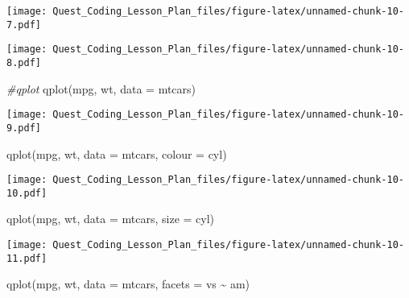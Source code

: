\documentclass[
]{article}
\newenvironment{Shaded}{\begin{snugshade}}{\end{snugshade}}
\newcommand{\AttributeTok}[1]{\textcolor[rgb]{0.77,0.63,0.00}{#1}}
\newcommand{\CommentTok}[1]{\textcolor[rgb]{0.56,0.35,0.01}{\textit{#1}}}
\newcommand{\FunctionTok}[1]{\textcolor[rgb]{0.00,0.00,0.00}{#1}}
\newcommand{\NormalTok}[1]{#1}
\newcommand{\SpecialCharTok}[1]{\textcolor[rgb]{0.00,0.00,0.00}{#1}}
\newcommand{\StringTok}[1]{\textcolor[rgb]{0.31,0.60,0.02}{#1}}
\begin{document}
\texttt{[image: Quest\_Coding\_Lesson\_Plan\_files/figure-latex/unnamed-chunk-10-7.pdf]}

\begin{Shaded}
\end{Shaded}

\texttt{[image: Quest\_Coding\_Lesson\_Plan\_files/figure-latex/unnamed-chunk-10-8.pdf]}

\begin{Shaded}
\begin{Highlighting}[]
\CommentTok{\#qplot}
\FunctionTok{qplot}\NormalTok{(mpg, wt, }\AttributeTok{data =}\NormalTok{ mtcars)}
\end{Highlighting}
\end{Shaded}

\texttt{[image: Quest\_Coding\_Lesson\_Plan\_files/figure-latex/unnamed-chunk-10-9.pdf]}

\begin{Shaded}
\begin{Highlighting}[]
\FunctionTok{qplot}\NormalTok{(mpg, wt, }\AttributeTok{data =}\NormalTok{ mtcars, }\AttributeTok{colour =}\NormalTok{ cyl)}
\end{Highlighting}
\end{Shaded}

\texttt{[image: Quest\_Coding\_Lesson\_Plan\_files/figure-latex/unnamed-chunk-10-10.pdf]}

\begin{Shaded}
\begin{Highlighting}[]
\FunctionTok{qplot}\NormalTok{(mpg, wt, }\AttributeTok{data =}\NormalTok{ mtcars, }\AttributeTok{size =}\NormalTok{ cyl)}
\end{Highlighting}
\end{Shaded}

\texttt{[image: Quest\_Coding\_Lesson\_Plan\_files/figure-latex/unnamed-chunk-10-11.pdf]}

\begin{Shaded}
\begin{Highlighting}[]
\FunctionTok{qplot}\NormalTok{(mpg, wt, }\AttributeTok{data =}\NormalTok{ mtcars, }\AttributeTok{facets =}\NormalTok{ vs }\SpecialCharTok{\textasciitilde{}}\NormalTok{ am)}
\end{Highlighting}
\end{Shaded}
\end{document}
